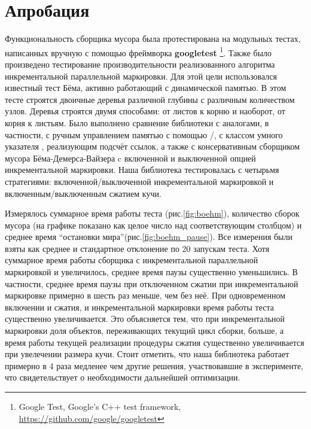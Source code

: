 \section{Апробация}

Функциональность сборщика мусора была протестирована на модульных тестах, 
написанных вручную с помощью фреймворка \textbf{googletest}
\footnote{Google Test, Google's C++ test framework,\\ 
\url{https://github.com/google/googletest}}. 
Также было произведено тестирование производительности реализованного алгоритма 
инкрементальной параллельной маркировки. 
Для этой цели использовался известный тест Бёма, активно работающий с динамической памятью. 
В этом тесте строятся двоичные деревья различной глубины с различным количеством узлов. 
Деревья строятся двумя способами: от листов к корню и наоборот, от корня к листьям. 
Было выполнено сравнение библиотеки с аналогами, в частности, с ручным управлением памятью 
с помощью /, с классом умного указателя , 
реализующим подсчёт ссылок, а также с консервативным сборщиком мусора Бёма-Демерса-Вайзера 
c включенной и выключенной опцией инкрементальной маркировки. 
Наша библиотека тестировалась с четырьмя стратегиями: включенной/выключенной 
инкрементальной маркировкой и включенным/выключенным сжатием кучи. 

Измерялось суммарное время работы теста (рис.\ref{fig:boehm}), количество сборок мусора 
(на графике показано как целое число над соответствующим столбцом) и среднее время 
``остановки мира''(рис.\ref{fig:boehm_pause}). 
Все измерения были взяты как среднее и стандартное отклонение по 20 запускам теста. 
Хотя суммарное время работы сборщика с инкрементальной параллельной маркировкой и увеличилось, 
среднее время паузы существенно уменьшились. 
В частности, среднее время паузы при отключенном сжатии при инкрементальной маркировке примерно 
в шесть раз меньше, чем без неё. 
При одновременном включении и сжатия, и инкрементальной маркировки время работы теста 
существенно увеличивается. 
Это объясняется тем, что при инкрементальной маркировки доля объектов, переживающих текущий 
цикл сборки, больше, а время работы текущей реализации процедуры сжатия существенно 
увеличивается при увелечении размера кучи. 
Стоит отметить, что наша библиотека работает примерно в 4 раза медленее чем другие решения, 
участвовавшие в эксперименте, что свидетельствует о необходимости дальнейшей оптимизации.

